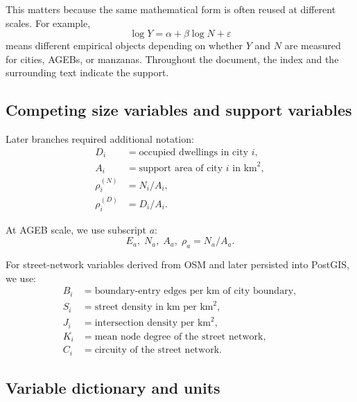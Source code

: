 \documentclass[11pt]{article}
\begin{document}
This matters because the same mathematical form is often reused at different scales. For example,
\begin{equation}
\log Y = \alpha + \beta \log N + \varepsilon
\end{equation}
means different empirical objects depending on whether \(Y\) and \(N\) are measured for cities, AGEBs, or manzanas. Throughout the document, the index and the surrounding text indicate the support.

\subsection{Competing size variables and support variables}

Later branches required additional notation:
\begin{align}
D_i &= \text{occupied dwellings in city } i,\\
A_i &= \text{support area of city } i \text{ in km}^2,\\
\rho_i^{(N)} &= N_i/A_i,\\
\rho_i^{(D)} &= D_i/A_i.
\end{align}

At AGEB scale, we use subscript \(a\):
\begin{equation}
E_a, \; N_a, \; A_a, \; \rho_a = N_a/A_a.
\end{equation}

For street-network variables derived from OSM and later persisted into PostGIS, we use:
\begin{align}
B_i &= \text{boundary-entry edges per km of city boundary},\\
S_i &= \text{street density in km per km}^2,\\
J_i &= \text{intersection density per km}^2,\\
K_i &= \text{mean node degree of the street network},\\
C_i &= \text{circuity of the street network}.
\end{align}

\subsection{Variable dictionary and units}
\end{document}
